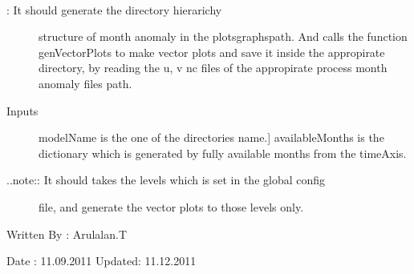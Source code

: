 \documentclass[letterpaper,10pt,english]{sphinxmanual}
\begin{document}

\begin{fulllineitems}
\label{diagnosis:generate_winds_plots.genMonthAnomalyDirs}~\begin{description}
\item[{{\hyperref[diagnosis:generate_winds_plots.genMonthAnomalyDirs]{}}: It should generate the directory hierarichy}] \leavevmode
structure of month anomaly in the plotsgraphspath. And calls the
function genVectorPlots to make vector plots and save it inside the
appropirate directory, by reading the u, v nc files of the appropirate
process month anomaly files path.

\item[{Inputs}] \leavevmode{[}modelName is the one of the directories name.{]}
availableMonths is the dictionary which is generated by fully
available months from the timeAxis.

\item[{..note:: It should takes the levels which is set in the global config}] \leavevmode
file, and generate the vector plots to those levels only.

\end{description}

Written By : Arulalan.T

Date : 11.09.2011
Updated: 11.12.2011

\end{fulllineitems}

\end{document}
